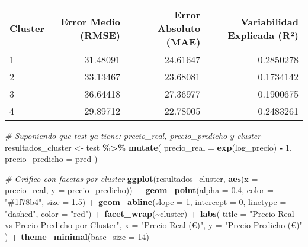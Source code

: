 \documentclass[
]{article}
\newenvironment{Shaded}{\begin{snugshade}}{\end{snugshade}}
\newcommand{\AttributeTok}[1]{\textcolor[rgb]{0.13,0.29,0.53}{#1}}
\newcommand{\CommentTok}[1]{\textcolor[rgb]{0.56,0.35,0.01}{\textit{#1}}}
\newcommand{\DecValTok}[1]{\textcolor[rgb]{0.00,0.00,0.81}{#1}}
\newcommand{\FloatTok}[1]{\textcolor[rgb]{0.00,0.00,0.81}{#1}}
\newcommand{\FunctionTok}[1]{\textcolor[rgb]{0.13,0.29,0.53}{\textbf{#1}}}
\newcommand{\NormalTok}[1]{#1}
\newcommand{\OtherTok}[1]{\textcolor[rgb]{0.56,0.35,0.01}{#1}}
\newcommand{\SpecialCharTok}[1]{\textcolor[rgb]{0.81,0.36,0.00}{\textbf{#1}}}
\newcommand{\StringTok}[1]{\textcolor[rgb]{0.31,0.60,0.02}{#1}}
\begin{document}
\begin{longtable}[t]{lrrr}
\toprule
Cluster & Error Medio (RMSE) & Error Absoluto (MAE) & Variabilidad Explicada (R²)\\
\midrule
1 & 31.48091 & 24.61647 & 0.2850278\\
2 & 33.13467 & 23.68081 & 0.1734142\\
3 & 36.64418 & 27.36977 & 0.1900675\\
4 & 29.89712 & 22.78005 & 0.2483261\\
\bottomrule
\end{longtable}

\begin{Shaded}
\begin{Highlighting}[]
\CommentTok{\# Suponiendo que test ya tiene: precio\_real, precio\_predicho y cluster}
\NormalTok{resultados\_cluster }\OtherTok{\textless{}{-}}\NormalTok{ test }\SpecialCharTok{\%\textgreater{}\%}
  \FunctionTok{mutate}\NormalTok{(}
    \AttributeTok{precio\_real =} \FunctionTok{exp}\NormalTok{(log\_precio) }\SpecialCharTok{{-}} \DecValTok{1}\NormalTok{,}
    \AttributeTok{precio\_predicho =}\NormalTok{ pred}
\NormalTok{  )}

\CommentTok{\# Gráfico con facetas por cluster}
\FunctionTok{ggplot}\NormalTok{(resultados\_cluster, }\FunctionTok{aes}\NormalTok{(}\AttributeTok{x =}\NormalTok{ precio\_real, }\AttributeTok{y =}\NormalTok{ precio\_predicho)) }\SpecialCharTok{+}
  \FunctionTok{geom\_point}\NormalTok{(}\AttributeTok{alpha =} \FloatTok{0.4}\NormalTok{, }\AttributeTok{color =} \StringTok{"\#1f78b4"}\NormalTok{, }\AttributeTok{size =} \FloatTok{1.5}\NormalTok{) }\SpecialCharTok{+}
  \FunctionTok{geom\_abline}\NormalTok{(}\AttributeTok{slope =} \DecValTok{1}\NormalTok{, }\AttributeTok{intercept =} \DecValTok{0}\NormalTok{, }\AttributeTok{linetype =} \StringTok{"dashed"}\NormalTok{, }\AttributeTok{color =} \StringTok{"red"}\NormalTok{) }\SpecialCharTok{+}
  \FunctionTok{facet\_wrap}\NormalTok{(}\SpecialCharTok{\textasciitilde{}}\NormalTok{cluster) }\SpecialCharTok{+}
  \FunctionTok{labs}\NormalTok{(}
    \AttributeTok{title =} \StringTok{"Precio Real vs Precio Predicho por Cluster"}\NormalTok{,}
    \AttributeTok{x =} \StringTok{"Precio Real (€)"}\NormalTok{,}
    \AttributeTok{y =} \StringTok{"Precio Predicho (€)"}
\NormalTok{  ) }\SpecialCharTok{+}
  \FunctionTok{theme\_minimal}\NormalTok{(}\AttributeTok{base\_size =} \DecValTok{14}\NormalTok{)}
\end{Highlighting}
\end{Shaded}
\end{document}
